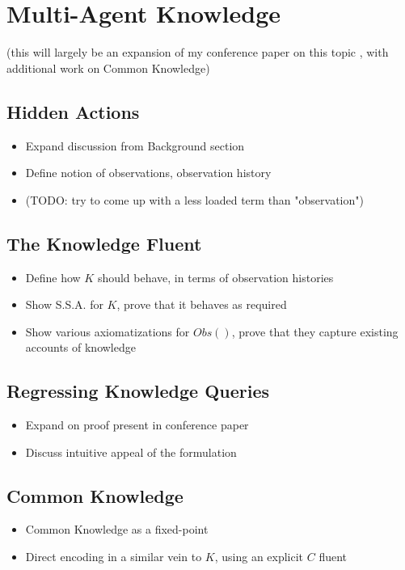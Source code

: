 \chapter{Multi-Agent Knowledge}\label{ch:knowledge}

(this will largely be an expansion of my conference paper on this topic \cite{kelly07sc_know_obs}, with additional work on Common Knowledge)

\section{Hidden Actions}

\begin{itemize}
\item Expand discussion from Background section
\item Define notion of observations, observation history
\item (TODO: try to come up with a less loaded term than "observation")
\end{itemize}

\section{The Knowledge Fluent}

\begin{itemize}
\item Define how $K$ should behave, in terms of observation histories
\item Show S.S.A. for $K$, prove that it behaves as required
\item Show various axiomatizations for $Obs()$, prove that they capture
existing accounts of knowledge
\end{itemize}

\section{Regressing Knowledge Queries}

\begin{itemize}
\item Expand on proof present in conference paper
\item Discuss intuitive appeal of the formulation
\end{itemize}

\section{Common Knowledge}

\begin{itemize}
\item Common Knowledge as a fixed-point
\item Direct encoding in a similar vein to $K$, using an explicit $C$ fluent
\end{itemize}


